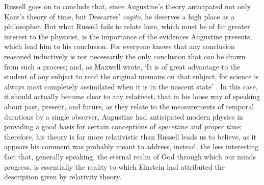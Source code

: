 Russell goes on to conclude that, since Augustine's theory anticipated not only Kant's theory of time, but Descartes' \textit{cogito}, he deserves a high place as a philosopher. But what Russell fails to relate here, which must be of far greater interest to the physicist, is the importance of the evidences Augustine presents, which lead him to his conclusion. For everyone knows that any conclusion reasoned inductively is not necessarily the only conclusion that \textit{can} be drawn from such a process; and, as Maxwell wrote, `It is of great advantage to the student of any subject to read the original memoirs on that subject, for science is always most completely assimilated when it is in the nascent state' \cite{Maxwell1892}. In this case, it should actually become clear to any relativist, that in his loose way of speaking about past, present, and future, as they relate to the measurements of temporal durations by a single observer, Augustine had anticipated modern physics in providing a good basis for certain conceptions of \textit{spacetime} and \textit{proper time}; therefore, his theory is far more relativistic than Russell leads us to believe, as it appears his comment was probably meant to address, instead, the less interesting fact that, generally speaking, the eternal realm of God through which our minds progress, is essentially the reality to which Einstein had attributed the description given by relativity theory. 


